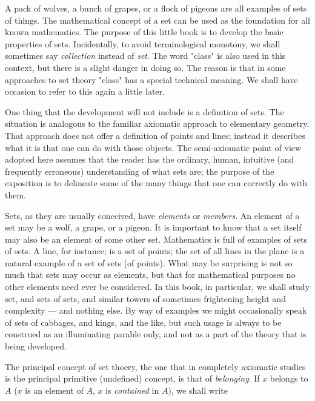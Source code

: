 
A pack of wolves, a bunch of grapes, or a flock of pigeons are all examples of sets of things. The mathematical concept of a set can be used as the foundation for all known mathematics. The purpose of this little book is to develop the basic properties of sets. Incidentally, to avoid terminological monotony, we shall sometimes say \textit{collection} instead of \textit{set}. The word "class" is also used in this context, but there is a slight danger in doing so. The reason is that in some approaches to set theory "class" has a special technical meaning. We shall have occasion to refer to this again a little later.

One thing that the development will not include is a definition of sets. The situation is analogous to the familiar axiomatic approach to elementary geometry. That approach does not offer a definition of points and lines; instead it describes what it is that one can do with those objects. The semi-axiomatic point of view adopted here assumes that the reader has the ordinary, human, intuitive (and frequently erroneous) understanding of what sets are; the purpose of the exposition is to delineate some of the many things that one can correctly do with them.

Sets, as they are usually conceived, have \textit{elements} or \textit{members}. An element of a set may be a wolf, a grape, or a pigeon. It is important to know that a set itself may also be an element of some other set. Mathematics is full of examples of sets of sets. A line, for instance; is a set of points; the set of all lines in the plane is a natural example of a set of sets (of points). What may be surprising is not so much that sets may occur as elements, but that for mathematical purposes no other elements need ever be considered. In this book, in particular, we shall study set, and sets of sets, and similar towers of sometimes frightening height and complexity — and nothing else. By way of examples we might occasionally speak of sets of cabbages, and kings, and the like, but such usage is always to be construed as an illuminating parable only, and not as a part of the theory that is being developed. 

The principal concept of set thoery, the one that in completely axiomatic studies is the principal primitive (undefined) concept, is that of \textit{belonging}. If $x$ belongs to $A$ ($x$ is an element of $A$, $x$ is \textit{contained} in $A$), we shall write 

